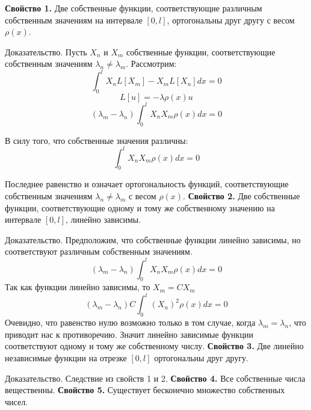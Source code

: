 \documentclass[12pt, a4paper]{report}
\begin{document}
\textbf{Свойство 1.} Две собственные функции, соответствующие различным собственным значениям на интервале $[0, l]$, ортогональны друг другу с весом $\rho(x)$.
\newline

Доказательство. Пусть $X_n$ и $X_m$ собственные функции, соответствующие собственным значениям $\lambda_n \neq \lambda_m$. Рассмотрим:
\[ \int_{0}^{l} X_n L[X_m] - X_m L[X_n] dx = 0 \]
\[ L[u] = -\lambda \rho(x) u\]
\[ (\lambda_m - \lambda_n) \int_{0}^{l} X_n X_m \rho(x) dx = 0 \]

В силу того, что собственные значения различны:
\[ \int_{0}^{l} X_n X_m \rho(x) dx = 0 \]

Последнее равенство и означает ортогональность функций, соответствующие собственным значениям $\lambda_n \neq \lambda_m$ с весом $\rho(x)$.
\newline
\textbf{Свойство 2.} Две собственные функции, соответствующие одному и тому же собственному значению на интервале $[0, l]$, линейно зависимы.
\newline

Доказательство. Предположим, что собственные функции линейно зависимы, но соответствуют различным собственным значениям.
\[ (\lambda_m - \lambda_n) \int_{0}^{l} X_n X_m \rho(x) dx = 0  \]
Так как функции линейно зависимы, то $X_m = CX_m$
\[ (\lambda_m - \lambda_n) C \int_{0}^{l} (X_n)^2 \rho(x) dx = 0 \]
Очевидно, что равенство нулю возможно только в том случае, когда $\lambda_m = \lambda_n$, что приводит нас к противоречию. Значит линейно зависимые функции соответствуют одному и тому же собственному числу.
\newline
\textbf{Свойство 3.} Две линейно независимые функции на отрезке $[0, l]$ ортогональны друг другу.

Доказательство. Следствие из свойств 1 и 2.
\newline
\textbf{Свойство 4.} Все собственные числа вещественны.
\newline
\textbf{Свойство 5.} Существует бесконечно множество собственных чисел.
\end{document}
